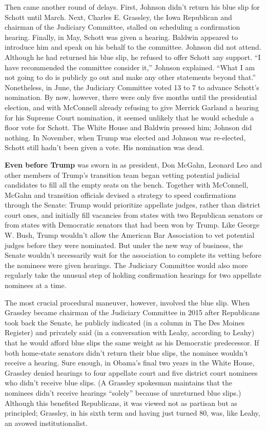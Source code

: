 Then came another round of delays. First, Johnson didn't return his blue
slip for Schott until March. Next, Charles E. Grassley, the Iowa
Republican and chairman of the Judiciary Committee, stalled on
scheduling a confirmation hearing. Finally, in May, Schott was given a
hearing. Baldwin appeared to introduce him and speak on his behalf to
the committee. Johnson did not attend. Although he had returned his blue
slip, he refused to offer Schott any support. ``I have recommended the
committee consider it,'' Johnson explained. ``What I am not going to do
is publicly go out and make any other statements beyond that.''
Nonetheless, in June, the Judiciary Committee voted 13 to 7 to advance
Schott's nomination. By now, however, there were only five months until
the presidential election, and with McConnell already refusing to give
Merrick Garland a hearing for his Supreme Court nomination, it seemed
unlikely that he would schedule a floor vote for Schott. The White House
and Baldwin pressed him; Johnson did nothing. In November, when Trump
was elected and Johnson was re-elected, Schott still hadn't been given a
vote. His nomination was dead.

\textbf{Even before Trump} was sworn in as president, Don McGahn,
Leonard Leo and other members of Trump's transition team began vetting
potential judicial candidates to fill all the empty seats on the bench.
Together with McConnell, McGahn and transition officials devised a
strategy to speed confirmations through the Senate: Trump would
prioritize appellate judges, rather than district court ones, and
initially fill vacancies from states with two Republican senators or
from states with Democratic senators that had been won by Trump. Like
George W. Bush, Trump wouldn't allow the American Bar Association to vet
potential judges before they were nominated. But under the new way of
business, the Senate wouldn't necessarily wait for the association to
complete its vetting before the nominees were given hearings. The
Judiciary Committee would also more regularly take the unusual step of
holding confirmation hearings for two appellate nominees at a time.

The most crucial procedural maneuver, however, involved the blue slip.
When Grassley became chairman of the Judiciary Committee in 2015 after
Republicans took back the Senate, he publicly indicated (in a column in
The Des Moines Register) and privately said (in a conversation with
Leahy, according to Leahy) that he would afford blue slips the same
weight as his Democratic predecessor. If both home-state senators didn't
return their blue slips, the nominee wouldn't receive a hearing. Sure
enough, in Obama's final two years in the White House, Grassley denied
hearings to four appellate court and five district court nominees who
didn't receive blue slips. (A Grassley spokesman maintains that the
nominees didn't receive hearings ``solely'' because of unreturned blue
slips.) Although this benefited Republicans, it was viewed not as
partisan but as principled; Grassley, in his sixth term and having just
turned 80, was, like Leahy, an avowed institutionalist.

